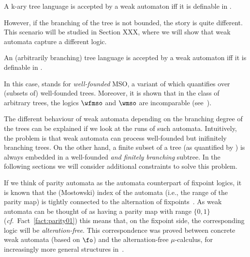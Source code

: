\begin{theorem}
	A k-ary tree language is accepted by a weak automaton iff it is definable in \wmso.
\end{theorem}

However, if the branching of the tree is not bounded, the story is quite different. This scenario will be studied in Section XXX, where we will show that weak automata capture a different logic.

\begin{theorem}
	An (arbitrarily branching) tree language is accepted by a weak automaton iff it is definable in \wfmso.
\end{theorem}

In this case, \wfmso stands for \emph{well-founded} MSO, a variant of \mso which quantifies over (subsets of) well-founded trees. Moreover, it is shown that in the class of arbitrary trees, the logics $\wfmso$ and $\wmso$ are incomparable (see~\cite[Corollary~5.16]{Zanasi2012}).

The different behaviour of weak automata depending on the branching degree of the trees can be explained if we look at the runs of such automata. Intuitively, the problem is that weak automata can process well-founded but inifinitely branching trees. On the other hand, a finite subset of a tree (as quantified by \wmso) is always embedded in a well-founded \emph{and finitely branching} subtree. In the following sections we will consider additional constraints to solve this problem.

If we think of parity automata as the automata counterpart of fixpoint logics, it is 
known that the (Mostowski) index of the automata (i.e., the range of the parity map) is
tightly connected to the alternation of fixpoints~\cite{Wilke2001}. As weak automata can
be thought of as having a parity map with range $\{0,1\}$ (\emph{cf.}~Fact~\ref{fact:parity01})
this means that, on the fixpoint side, the corresponding logic will be \emph{alteration-free}.
This correspondence was
proved between concrete weak automata (based on $\fo$) and the alternation-free $\mu$-calculus, for increasingly more general structures in~\cite{Arnold1992,DBLP:journals/tocl/KupfermanV05,DBLP:conf/lics/KupfermanV98,Kupferman2003}.